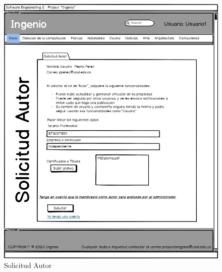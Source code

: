 \documentclass[a4paper,12 pt]{article}
\begin{document}
\begin{figure}[H]
    \centering
    \includegraphics[scale = 1.4]{images/SolicitudAutor.jpg}
    \caption{Solicitud Autor}
    \label{F103}
\end{figure}{}
\end{document}
